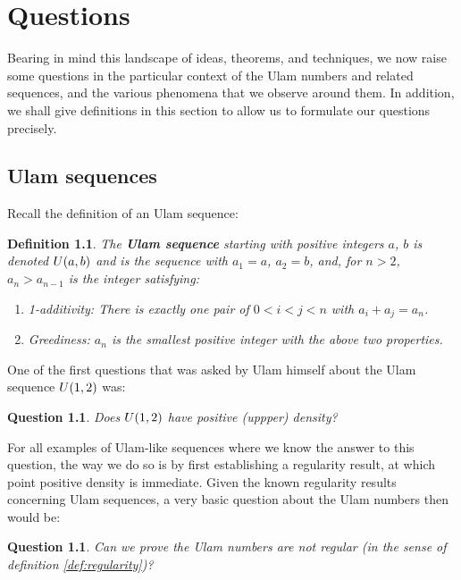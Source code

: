 \documentclass{report}
\newtheorem{question}[theorem]{Question}
\newtheorem{definition}[theorem]{Definition}
\theoremstyle{remark}
\numberwithin{equation}{section}
\begin{document}
\chapter{Questions}

Bearing in mind this landscape of ideas, theorems, and techniques, we
now raise some questions in the particular context of the Ulam numbers
and related sequences, and the various phenomena that we observe
around them.  In addition, we shall give definitions in this section
to allow us to formulate our questions precisely.

\section{Ulam sequences}

Recall the definition of an Ulam sequence: 

\begin{definition}
  The \textbf{Ulam sequence} starting with positive integers $a$, $b$
  is denoted $U(a,b)$ and is the sequence with $a_1 = a$,
  $a_2 = b$, and, for $n > 2$, $a_n > a_{n-1}$ is the integer satisfying:
  \begin{enumerate}
  \item 1-additivity: There is exactly one pair of $0 < i < j < n$ with $a_i + a_j = a_n$.
  \item Greediness: $a_n$ is the smallest positive integer with the above two
    properties.
\end{enumerate}

\end{definition}

One of the first questions that was asked by Ulam himself about the
Ulam sequence $U(1,2)$ was: 

\begin{question}\label{qn:density}
  Does $U(1,2)$ have positive (uppper) density?
\end{question}

For all examples of Ulam-like sequences where we know the answer to
this question, the way we do so is by first establishing a regularity
result, at which point positive density is immediate.  Given the known
regularity results concerning Ulam sequences, a very basic question
about the Ulam numbers then would be:

\begin{question}\label{qn:irregular}
  Can we prove the Ulam numbers are not regular (in the sense of
  definition \ref{def:regularity})?
\end{question}
\end{document}
